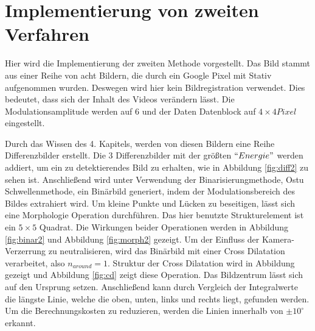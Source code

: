 


\section{Implementierung von zweiten Verfahren}

Hier wird die Implementierung der zweiten Methode vorgestellt. Das Bild stammt aus einer Reihe von acht Bildern, die durch ein Google Pixel mit Stativ aufgenommen wurden. Deswegen wird hier kein Bildregistration verwendet. Dies bedeutet, dass sich der Inhalt des Videos verändern lässt. Die Modulationsamplitude werden auf 6 und der Daten Datenblock auf $ 4 \times 4 Pixel$ eingestellt. 

Durch das Wissen des 4. Kapitels, werden von diesen Bildern eine Reihe Differenzbilder erstellt. Die 3 Differenzbilder mit der größten $``Energie"$ werden addiert, um ein zu detektierendes Bild zu erhalten, wie in Abbildung \ref{fig:diff2} zu sehen ist. Anschließend wird unter Verwendung der Binarisierungmethode, Ostu Schwellenmethode, ein Binärbild generiert, indem der Modulationsbereich des Bildes extrahiert wird. Um kleine Punkte und Lücken zu beseitigen, lässt sich eine Morphologie Operation durchführen. Das hier benutzte Strukturelement ist ein $5 \times 5$ Quadrat. Die Wirkungen beider Operationen werden in Abbildung \ref{fig:binar2} und Abbildung \ref{fig:morph2} gezeigt. Um der Einfluss der Kamera-Verzerrung zu neutralisieren, wird das Binärbild mit einer Cross Dilatation verarbeitet, also $ n_{around} = 1$. Struktur der Cross Dilatation wird in Abbildung gezeigt und Abbildung \ref{fig:cd} zeigt diese Operation. Das Bildzentrum lässt sich auf den Ursprung setzen. Anschließend kann durch Vergleich der Integralwerte die längste Linie, welche die oben, unten, links und rechts liegt, gefunden werden. Um die Berechnungskosten zu reduzieren, werden die Linien innerhalb von $ \pm 10^{\circ} $ erkannt. 




